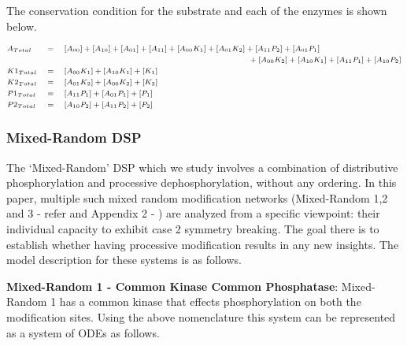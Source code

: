 \documentclass[9pt,lineno]{elife}
\begin{document}
\begin{appendixbox}
The conservation condition for the substrate and each of the enzymes is shown below.

\begin{equation}
\scriptsize{    \begin{alignedat}{3}
 & A_{Total} \quad &&= \quad [A_{00}]+[A_{10}]+[A_{01}]+[A_{11}]+[A_{00}K_1]+[A_{01}K_2]+[A_{11}P_2]+[A_{01}P_1] && \\ 
    & && \hspace{70mm} +[A_{00}K_2]+[A_{10}K_1]+[A_{11}P_1]+[A_{10}P_2] && \\
    & K1_{Total} \quad &&= \quad [A_{00}K_1]+[A_{10}K_1]+[K_1] && \\
    & K2_{Total} \quad &&= \quad [A_{01}K_2]+[A_{00}K_2]+[K_2] && \\
    & P1_{Total} \quad &&= \quad [A_{11}P_1]+[A_{01}P_1]+[P_1] && \\
    & P2_{Total} \quad &&= \quad [A_{10}P_2]+[A_{11}P_2]+[P_2] && \\
    \end{alignedat} }
\end{equation}

\subsubsection*{Mixed-Random DSP}

The `Mixed-Random' DSP which we study  involves a combination of distributive phosphorylation and processive dephosphorylation, without any ordering. In this paper, multiple such mixed random modification networks (Mixed-Random 1,2 and 3 - refer  and Appendix 2 - ) are analyzed from a specific viewpoint: their individual capacity to exhibit case 2 symmetry breaking. The goal there is to establish whether having processive modification results in any new insights. The model description for these systems is as follows. 

\textbf{Mixed-Random 1 - Common Kinase Common Phosphatase}: Mixed-Random 1 has a common kinase that effects phosphorylation on both the modification sites. Using the above nomenclature this system can be represented as a system of ODEs as follows. 


\end{appendixbox}
\end{document}
